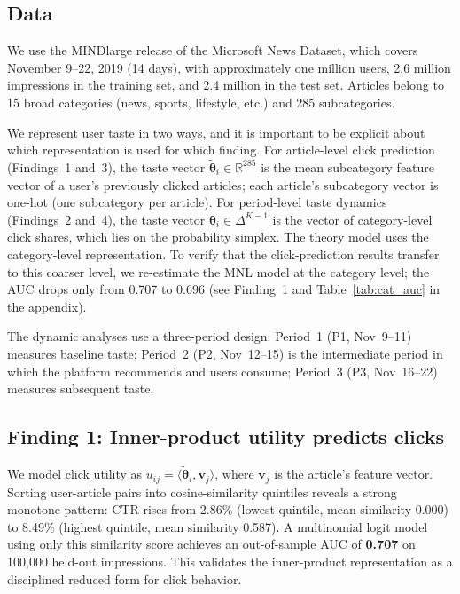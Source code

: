 \documentclass[11pt]{article}
\newcommand{\R}{\mathbb{R}}
\begin{document}
\subsection{Data}

We use the MINDlarge release of the Microsoft News Dataset, which covers November 9--22, 2019 (14 days), with approximately one million users, 2.6 million impressions in the training set, and 2.4 million in the test set. Articles belong to 15 broad categories (news, sports, lifestyle, etc.) and 285 subcategories.

We represent user taste in two ways, and it is important to be explicit about which representation is used for which finding. For article-level click prediction (Findings~1 and~3), the taste vector $\tilde{\boldsymbol{\theta}}_i \in \R^{285}$ is the mean subcategory feature vector of a user's previously clicked articles; each article's subcategory vector is one-hot (one subcategory per article). For period-level taste dynamics (Findings~2 and~4), the taste vector $\boldsymbol{\theta}_i \in \Delta^{K-1}$ is the vector of category-level click shares, which lies on the probability simplex. The theory model uses the category-level representation. To verify that the click-prediction results transfer to this coarser level, we re-estimate the MNL model at the category level; the AUC drops only from 0.707 to 0.696 (see Finding~1 and Table~\ref{tab:cat_auc} in the appendix).

The dynamic analyses use a three-period design: Period~1 (P1, Nov~9--11) measures baseline taste; Period~2 (P2, Nov~12--15) is the intermediate period in which the platform recommends and users consume; Period~3 (P3, Nov~16--22) measures subsequent taste.

\subsection{Finding 1: Inner-product utility predicts clicks}

We model click utility as $u_{ij} = \langle \tilde{\boldsymbol{\theta}}_i, \mathbf{v}_j \rangle$, where $\mathbf{v}_j$ is the article's feature vector. Sorting user-article pairs into cosine-similarity quintiles reveals a strong monotone pattern: CTR rises from 2.86\% (lowest quintile, mean similarity 0.000) to 8.49\% (highest quintile, mean similarity 0.587). A multinomial logit model using only this similarity score achieves an out-of-sample AUC of \textbf{0.707} on 100,000 held-out impressions. This validates the inner-product representation as a disciplined reduced form for click behavior.
\end{document}
